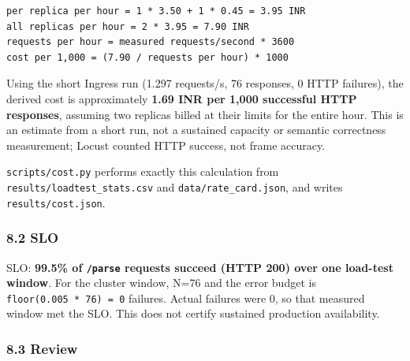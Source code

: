\documentclass[
]{article}
\begin{document}
\begin{verbatim}
per replica per hour = 1 * 3.50 + 1 * 0.45 = 3.95 INR
all replicas per hour = 2 * 3.95 = 7.90 INR
requests per hour = measured requests/second * 3600
cost per 1,000 = (7.90 / requests per hour) * 1000
\end{verbatim}

Using the short Ingress run (1.297 requests/s, 76 responses, 0 HTTP
failures), the derived cost is approximately \textbf{1.69 INR per 1,000
successful HTTP responses}, assuming two replicas billed at their limits
for the entire hour. This is an estimate from a short run, not a
sustained capacity or semantic correctness measurement; Locust counted
HTTP success, not frame accuracy.

\texttt{scripts/cost.py} performs exactly this calculation from
\texttt{results/loadtest\_stats.csv} and \texttt{data/rate\_card.json},
and writes \texttt{results/cost.json}.

\hypertarget{slo}{%
\subsubsection{8.2 SLO}\label{slo}}

SLO: \textbf{99.5\% of \texttt{/parse} requests succeed (HTTP 200) over
one load-test window}. For the cluster window, N=76 and the error budget
is \texttt{floor(0.005\ *\ 76)\ =\ 0} failures. Actual failures were 0,
so that measured window met the SLO. This does not certify sustained
production availability.

\hypertarget{review}{%
\subsubsection{8.3 Review}\label{review}}
\end{document}
